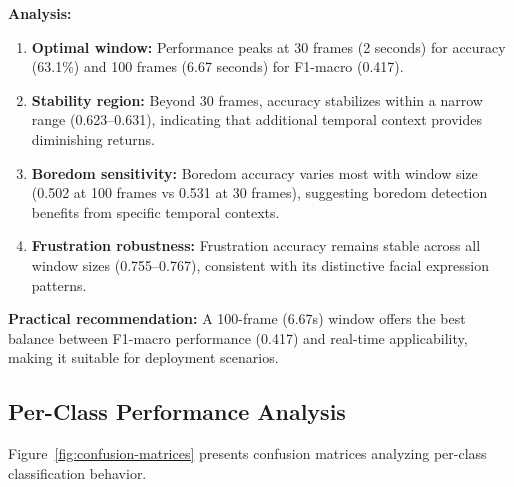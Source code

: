 \textbf{Analysis:}
\begin{enumerate}
    \item \textbf{Optimal window:} Performance peaks at 30 frames (2 seconds) for accuracy (63.1\%) and 100 frames (6.67 seconds) for F1-macro (0.417).

    \item \textbf{Stability region:} Beyond 30 frames, accuracy stabilizes within a narrow range (0.623--0.631), indicating that additional temporal context provides diminishing returns.

    \item \textbf{Boredom sensitivity:} Boredom accuracy varies most with window size (0.502 at 100 frames vs 0.531 at 30 frames), suggesting boredom detection benefits from specific temporal contexts.

    \item \textbf{Frustration robustness:} Frustration accuracy remains stable across all window sizes (0.755--0.767), consistent with its distinctive facial expression patterns.
\end{enumerate}

\textbf{Practical recommendation:} A 100-frame (6.67s) window offers the best balance between F1-macro performance (0.417) and real-time applicability, making it suitable for deployment scenarios.

\subsection{Per-Class Performance Analysis}
\label{sec:per-class}

Figure~\ref{fig:confusion-matrices} presents confusion matrices analyzing per-class classification behavior.

